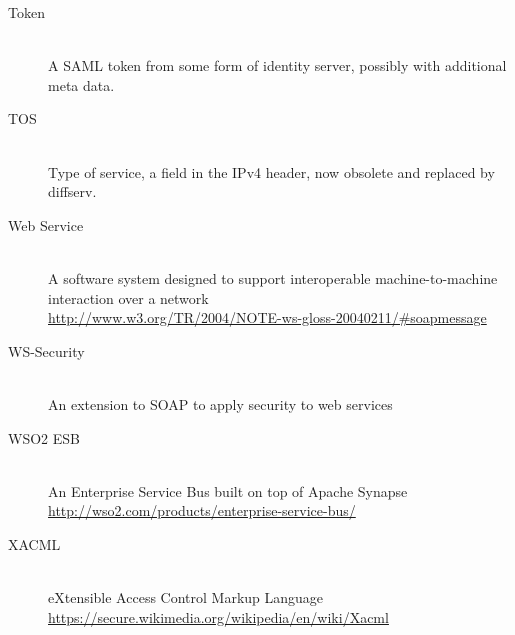 \begin{description}
\item[Token]\label{glossary:token} \hfill\\
A SAML token from some form of identity server, possibly with additional meta data.

\item[TOS]\label{glossary:tos} \hfill \\ 
Type of service, a field in the IPv4 header, now obsolete and replaced by diffserv.

\item[Web Service]\label{glossary:web service} \hfill\\
A software system designed to support interoperable machine-to-machine interaction over a network \\ \url{http://www.w3.org/TR/2004/NOTE-ws-gloss-20040211/#soapmessage}

\item[WS-Security]\label{glossary:ws-security} \hfill\\
An extension to SOAP to apply security to web services

\item[WSO2 ESB]\label{glossary:wso2 esb} \hfill\\
An Enterprise Service Bus built on top of Apache Synapse \\ \url{http://wso2.com/products/enterprise-service-bus/}

\item[XACML]\label{glossary:xacml} \hfill\\
eXtensible Access Control Markup Language  \\ \url{https://secure.wikimedia.org/wikipedia/en/wiki/Xacml}

\end{description}
